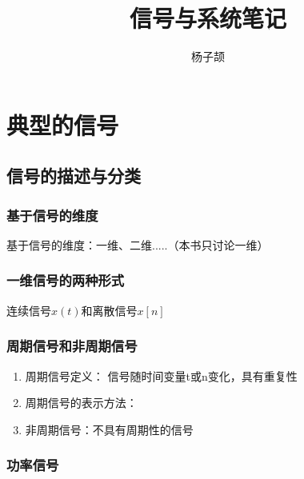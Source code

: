 \documentclass{ctexart}
\title{信号与系统笔记}
\author{杨子颉}
\numberwithin{figure}{section}
\numberwithin{equation}{section}
\begin{document}
\maketitle

\newpage
\tableofcontents
\newpage
\section{典型的信号}
    \subsection{信号的描述与分类}
        \subsubsection{基于信号的维度}
            基于信号的维度：一维、二维.....（本书只讨论一维）
        \subsubsection{一维信号的两种形式}
            连续信号$x(t)$和离散信号$x[n]$
        \subsubsection{周期信号和非周期信号}
            \begin{enumerate}
                \item[1)]周期信号定义： 信号随时间变量t或n变化，具有重复性
                \item[2)]周期信号的表示方法：
                
                \item[3)]非周期信号：不具有周期性的信号
            \end{enumerate}

        \subsubsection{功率信号}
\end{document}

